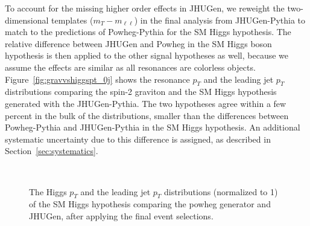 To account for the missing higher order effects in JHUGen,
we reweight the two-dimensional templates ($m_T-m_{\ell\ell}$) 
in the final analysis from JHUGen-Pythia to match to the predictions of Powheg-Pythia for the SM Higgs hypothesis. 
The relative difference between JHUGen and Powheg in the SM Higgs boson hypothesis is then applied to the other signal hypotheses as well, because we 
assume the effects are similar as all resonances are colorless objects. 
Figure~\ref{fig:gravvshiggspt_0j} shows the resonance $p_T$ and 
the leading jet $p_T$ distributions comparing the spin-2 
graviton and the SM Higgs hypothesis generated with the JHUGen-Pythia. 
The two hypotheses agree within a few percent in the bulk of the distributions,
smaller than the differences between Powheg-Pythia and JHUGen-Pythia 
in the SM Higgs hypothesis. 
An additional systematic uncertainty due to this difference is assigned,
as described in Section~\ref{sec:systematics}. 


\begin{figure}[!hbtp]
\centering
{}
\\
\caption{The Higgs $p_T$ and the leading jet $p_T$ distributions (normalized to 1) of the 
SM Higgs hypothesis comparing the powheg generator and JHUGen, after 
applying the final event selections. }
\label{fig:higgspt_0j}
\end{figure}


